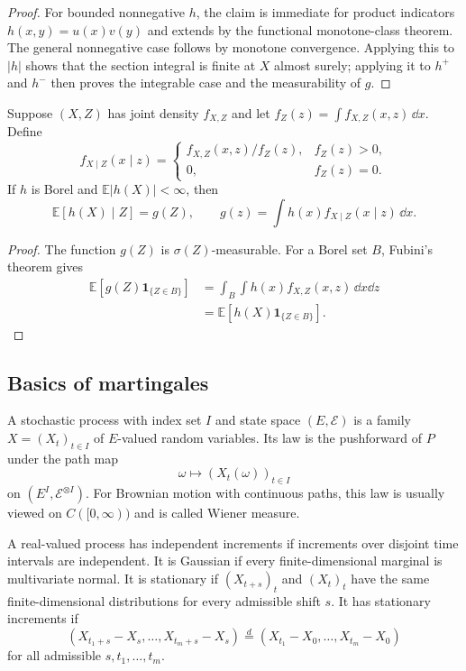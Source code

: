 \begin{proof}
For bounded nonnegative $h$, the claim is immediate for product indicators
$h(x,y)=u(x)v(y)$ and extends by the functional monotone-class theorem. The
general nonnegative case follows by monotone convergence. Applying this to
$|h|$ shows that the section integral is finite at $X$ almost surely; applying
it to $h^+$ and $h^-$ then proves the integrable case and the measurability of
$g$.
\end{proof}

\begin{eg}
Suppose $(X,Z)$ has joint density $f_{X,Z}$ and let
$f_Z(z)=\int f_{X,Z}(x,z)\,\dd x$. Define
\[
f_{X\mid Z}(x\mid z)=
\begin{cases}
 f_{X,Z}(x,z)/f_Z(z),&f_Z(z)>0,\\
 0,&f_Z(z)=0.
\end{cases}
\]
If $h$ is Borel and $\mathbb E|h(X)|<\infty$, then
\[
\mathbb E[h(X)\mid Z]
 =g(Z),
\qquad
g(z)=\int h(x)f_{X\mid Z}(x\mid z)\,\dd x.
\]
\end{eg}

\begin{proof}
The function $g(Z)$ is $\sigma(Z)$-measurable. For a Borel set $B$,
Fubini's theorem gives
\begin{align*}
\mathbb E[g(Z)\mathbf1_{\{Z\in B\}}]
&=\int_B\int h(x)f_{X,Z}(x,z)\,\dd x\dd z\\
&=\mathbb E[h(X)\mathbf1_{\{Z\in B\}}].
\end{align*}
\end{proof}

\subsection{Basics of martingales}

\begin{de}
A stochastic process with index set $I$ and state space $(E,\mathcal E)$ is a
family $X=(X_t)_{t\in I}$ of $E$-valued random variables. Its law is the
pushforward of $P$ under the path map
\[
\omega\longmapsto(X_t(\omega))_{t\in I}
\]
on $(E^I,\mathcal E^{\otimes I})$. For Brownian motion with continuous paths,
this law is usually viewed on $C([0,\infty))$ and is called Wiener measure.
\end{de}

\begin{de}
A real-valued process has independent increments if increments over disjoint
time intervals are independent. It is Gaussian if every finite-dimensional
marginal is multivariate normal. It is stationary if
$(X_{t+s})_t$ and $(X_t)_t$ have the same finite-dimensional distributions
for every admissible shift $s$. It has stationary increments if
\[
(X_{t_1+s}-X_s,\ldots,X_{t_m+s}-X_s)
\stackrel d=
(X_{t_1}-X_0,\ldots,X_{t_m}-X_0)
\]
for all admissible $s,t_1,\ldots,t_m$.
\end{de}

